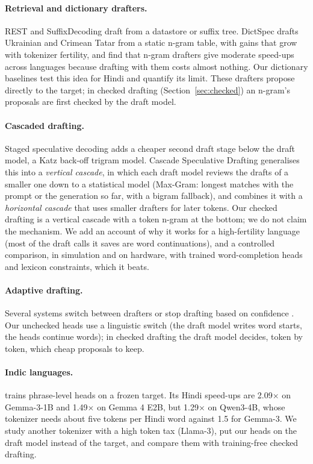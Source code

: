 \documentclass[11pt]{article}
\newcommand{\x}{$\times$}
\begin{document}
\paragraph{Retrieval and dictionary drafters.}
REST \citep{he2024rest} and SuffixDecoding \citep{oliaro2024suffixdecoding} draft from a datastore
or suffix tree. DictSpec \citep{dictspec2026} drafts Ukrainian and Crimean Tatar from a static
n-gram table, with gains that grow with tokenizer fertility, and \citet{paudel2026ngram} find that
n-gram drafters give moderate speed-ups across languages because drafting with them costs almost
nothing. Our dictionary baselines test this idea for Hindi and quantify its limit. These drafters
propose directly to the target; in checked drafting (Section~\ref{sec:checked}) an n-gram's proposals
are first checked by the draft model.

\paragraph{Cascaded drafting.}
Staged speculative decoding \citep{spector2023staged} adds a cheaper second draft stage below the draft
model, a Katz back-off trigram model. Cascade Speculative Drafting \citep{chen2024cascade} generalises
this into a \emph{vertical cascade}, in which each draft model reviews the drafts of a smaller one down
to a statistical model (Max-Gram: longest matches with the prompt or the generation so far, with a
bigram fallback), and combines it with a \emph{horizontal cascade} that uses smaller drafters for later
tokens. Our checked drafting is a vertical cascade with a token n-gram at the bottom; we do not claim the
mechanism. We add an account of why it works for a high-fertility language (most of the draft calls it
saves are word continuations), and a controlled comparison, in simulation and on hardware, with trained
word-completion heads and lexicon constraints, which it beats.

\paragraph{Adaptive drafting.}
Several systems switch between drafters or stop drafting based on confidence
\citep[e.g.][]{respec2026,talon2026,metasd2025}. Our unchecked heads use a linguistic switch (the draft
model writes word starts, the heads continue words); in checked drafting the draft model decides, token
by token, which cheap proposals to keep.

\paragraph{Indic languages.}
\citet{naidu2026phrase} trains phrase-level heads on a frozen target. Its Hindi speed-ups are
2.09\x{} on Gemma-3-1B and 1.49\x{} on Gemma 4 E2B, but 1.29\x{} on Qwen3-4B, whose tokenizer needs
about five tokens per Hindi word against 1.5 for Gemma-3. We study another tokenizer with a high token
tax (Llama-3), put our heads on the draft model instead of the target, and compare them with
training-free checked drafting.
\end{document}
